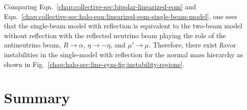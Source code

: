 Comparing Eqn.~\eqref{chap:collective-sec:bipolar-linearized-eom} and Eqn.~\eqref{chap:collective-sec:halo-eqn:linearized-eom-single-beam-model}, one sees that the single-beam model with reflection is equivalent to the two-beam model without reflection with the reflected neutrino beam playing the role of the antineutrino beam, $R\to \alpha$, $\eta \to -\eta$, and $\mu' \to \mu$. Therefore, there exist flavor instabilities in the single-model with reflection for the normal mass hierarchy as shown in Fig.~\ref{chap:halo-sec:line-sym-fig:instability-regions}.













\section{\label{chap:collective-sec:conclusion}Summary}

